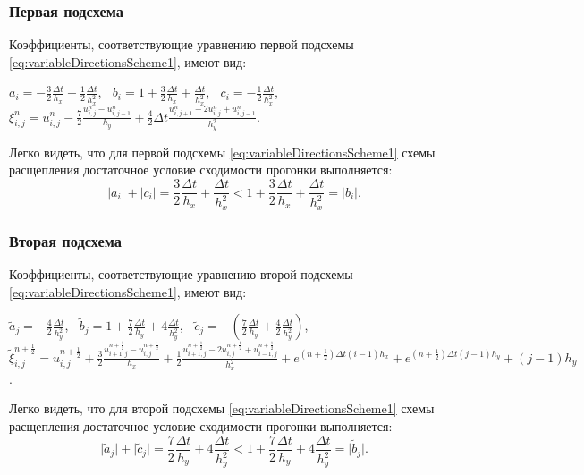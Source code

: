 \documentclass[12pt, a4paper]{report}
\begin{document}
	\subsubsection*{Первая подсхема}
	\large
	Коэффициенты, соответствующие уравнению первой подсхемы \eqref{eq:variableDirectionsScheme1}, имеют вид:
	\small
	\begin{center}
		$a_{i}=-\frac{3}{2}\frac{\Delta t}{h_{x}} - \frac{1}{2}\frac{\Delta t}{h_{x}^{2}}$, $\>$ $b_{i}=1 + \frac{3}{2}\frac{\Delta t}{h_{x}} + \frac{\Delta t}{h_{x}^{2}}$, $\>$ $c_{i}=- \frac{1}{2}\frac{\Delta t}{h_{x}^{2}}$, $\>$ $\xi_{i, j}^{n}=u_{i, j}^{n} - \frac{7}{2}\frac{u_{i, j}^{n} - u_{i, j-1}^{n}}{h_{y}} + \frac{4}{2}\Delta t\frac{u_{i, j+1}^{n} - 2u_{i, j}^{n} + u_{i, j-1}^{n}}{h_{y}^{2}}$.
	\end{center}
	\par
	\large
	Легко видеть, что для первой подсхемы \eqref{eq:variableDirectionsScheme1} схемы расщепления достаточное условие сходимости прогонки выполняется:
	\begin{equation*}
		\lvert a_{i} \rvert + \lvert c_{i} \rvert = \frac{3}{2}\frac{\Delta t}{h_{x}} + \frac{\Delta t}{h_{x}^{2}} < 1 + \frac{3}{2}\frac{\Delta t}{h_{x}} + \frac{\Delta t}{h_{x}^{2}} = \lvert b_{i} \rvert.
	\end{equation*}
	\subsubsection*{Вторая подсхема}
	\large
	Коэффициенты, соответствующие уравнению второй подсхемы \eqref{eq:variableDirectionsScheme1}, имеют вид:
	\small
	\begin{center}
		$\tilde{a}_{j}=-\frac{4}{2}\frac{\Delta t}{h_{y}^{2}}$, $\>$ $\tilde{b}_{j}=1 + \frac{7}{2}\frac{\Delta t}{h_{y}} + 4\frac{\Delta t}{h_{y}^{2}}$, $\>$ $\tilde{c}_{j}=-(\frac{7}{2}\frac{\Delta t}{h_{y}} + \frac{4}{2}\frac{\Delta t}{h_{y}^{2}})$, $\>$ $\tilde{\xi}_{i, j}^{n+\frac{1}{2}}=u_{i, j}^{n+\frac{1}{2}} + \frac{3}{2}\frac{u_{i+1, j}^{n+\frac{1}{2}} - u_{i, j}^{n+\frac{1}{2}}}{h_{x}} + \frac{1}{2}\frac{u_{i+1, j}^{n+\frac{1}{2}} - 2u_{i, j}^{n+\frac{1}{2}} + u_{i-1, j}^{n+\frac{1}{2}}}{h_{x}^{2}} + e^{(n+\frac{1}{2})\Delta t(i-1)h_{x}} + e^{(n+\frac{1}{2})\Delta t(j-1)h_{y}} + (j-1)h_{y}$.
	\end{center}
	\par
	\large
	Легко видеть, что для второй подсхемы \eqref{eq:variableDirectionsScheme1} схемы расщепления достаточное условие сходимости прогонки выполняется:
	\begin{equation*}
		\lvert \tilde{a}_{j} \rvert + \lvert \tilde{c}_{j} \rvert = \frac{7}{2}\frac{\Delta t}{h_{y}} + 4\frac{\Delta t}{h_{y}^{2}} < 1 + \frac{7}{2}\frac{\Delta t}{h_{y}} + 4\frac{\Delta t}{h_{y}^{2}} = \lvert \tilde{b}_{j} \rvert.
	\end{equation*}
	
\end{document}
